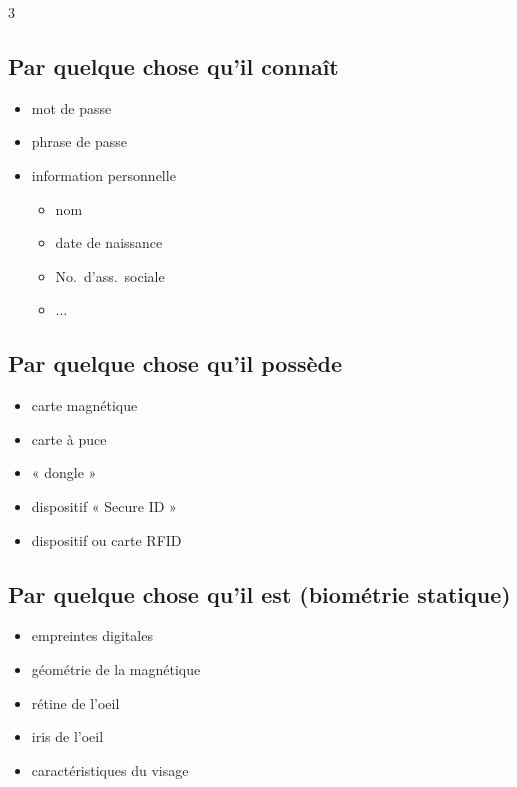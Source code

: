 \documentclass[9pt, a4paper, twoside]{article}
\begin{document}
\begin{multicols}{3}
\footnotesize \subsection{Par quelque chose qu'il connaît}

\begin{itemize}[label=$\circ$]
    \item \scriptsize mot de passe
    \item \scriptsize phrase de passe
    \item \scriptsize information personnelle
    \begin{itemize}[label=$\bullet$]
        \item \scriptsize nom
        \item \scriptsize date de naissance
        \item \scriptsize No.\ d'ass.\ sociale
        \item \scriptsize $\ldots$
    \end{itemize}
\end{itemize}

\footnotesize \subsection{Par quelque chose qu'il possède}

\begin{itemize}[label=$\circ$]
    \item \scriptsize carte magnétique
    \item \scriptsize carte à puce
    \item \scriptsize « dongle »
    \item \scriptsize dispositif « Secure ID »
    \item \scriptsize dispositif ou carte RFID
\end{itemize}

\footnotesize \subsection{Par quelque chose qu'il est (biométrie statique)}

\begin{itemize}[label=$\circ$]
    \item \scriptsize empreintes digitales
    \item \scriptsize géométrie de la magnétique
    \item \scriptsize rétine de l'oeil
    \item \scriptsize iris de l'oeil
    \item \scriptsize caractéristiques du visage 
\end{itemize}


\end{multicols}
\end{document}
